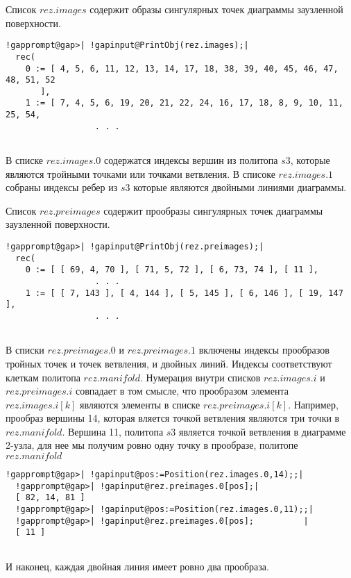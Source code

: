 \documentclass[a4paper,11pt]{report}
\begin{document}
{{{\begin{Verbatim}[commandchars=!@|,fontsize=\small,frame=single,label=Пример]
\end{Verbatim}
 

 Список $rez.images$ содержит
образы
сингулярных
точек
диаграммы
заузленной
поверхности. 
\begin{Verbatim}[commandchars=!@|,fontsize=\small,frame=single,label=Пример]
  !gapprompt@gap>| !gapinput@PrintObj(rez.images);|
  rec(
    0 := [ 4, 5, 6, 11, 12, 13, 14, 17, 18, 38, 39, 40, 45, 46, 47, 48, 51, 52 
       ],
    1 := [ 7, 4, 5, 6, 19, 20, 21, 22, 24, 16, 17, 18, 8, 9, 10, 11, 25, 54, 
                  . . .
  					
\end{Verbatim}
 В
списке $rez.images.0$ содержатся
индексы
вершин
из
политопа $s3$,
которые
являются
тройными
точками
или
точками
ветвления.
В
списоке $rez.images.1$ собраны
индексы
ребер
из $s3$ которые
являются
двойными
линиями
диаграммы. 

 Список $rez.preimages$ содержит
прообразы
сингулярных
точек
диаграммы
заузленной
поверхности. 
\begin{Verbatim}[commandchars=!@|,fontsize=\small,frame=single,label=Пример]
  !gapprompt@gap>| !gapinput@PrintObj(rez.preimages);|
  rec(
    0 := [ [ 69, 4, 70 ], [ 71, 5, 72 ], [ 6, 73, 74 ], [ 11 ], 
                  . . .
    1 := [ [ 7, 143 ], [ 4, 144 ], [ 5, 145 ], [ 6, 146 ], [ 19, 147 ], 
                  . . .
  					
\end{Verbatim}
 В
списки $rez.preimages.0$ и $rez.preimages.1$ включены
индексы
прообразов
тройных
точек
и
точек
ветвления,
и
двойных
линий.
Индексы
соответствуют
клеткам
политопа $rez.manifold$.
Нумерация
внутри
списков $rez.images.i$ и $rez.preimages.i$ совпадает
в том
смысле,
что
прообразом
элемента $rez.images.i[k]$ являются
элементы
в
списке $rez.preimages.i[k]$.
Например,
прообраз
вершины
14,
которая
вляется
точкой
ветвления
являются
три
точки
в $rez.manifold$.
Вершина
11,
политопа $s3$ является
точкой
ветвления
в
диаграмме
2-узла,
для
нее мы
получим
ровно
одну
точку
в
прообразе,
политопе $rez.manifold$ 
\begin{Verbatim}[commandchars=!@|,fontsize=\small,frame=single,label=Пример]
  !gapprompt@gap>| !gapinput@pos:=Position(rez.images.0,14);;|
  !gapprompt@gap>| !gapinput@rez.preimages.0[pos];|
  [ 82, 14, 81 ]
  !gapprompt@gap>| !gapinput@pos:=Position(rez.images.0,11);;|
  !gapprompt@gap>| !gapinput@rez.preimages.0[pos];          |
  [ 11 ]
  					
\end{Verbatim}
 И
наконец,
каждая
двойная
линия
имеет
ровно
два
прообраза. 

}}}
\end{document}
